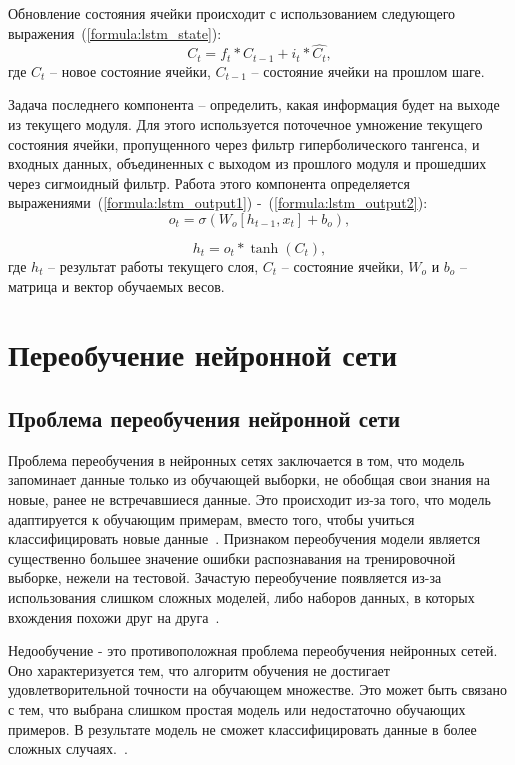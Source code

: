 Обновление состояния ячейки происходит с использованием следующего выражения~(\ref{formula:lstm_state}):
\begin{equation}\label{formula:lstm_state}
	C_t = f_t * C_{t-1} + i_t*\hat{C_t},
\end{equation}
где $C_t$ -- новое состояние ячейки, $C_{t-1}$ -- состояние ячейки на прошлом шаге.

Задача последнего компонента -- определить, какая информация будет на выходе из текущего модуля.
Для этого используется поточечное умножение текущего состояния ячейки, пропущенного через фильтр гиперболического тангенса, и входных данных, объединенных с выходом из прошлого модуля и прошедших через сигмоидный фильтр.
Работа этого компонента определяется выражениями~(\ref{formula:lstm_output1}) -~(\ref{formula:lstm_output2}):
\begin{equation}\label{formula:lstm_output1}
	o_t = \sigma(W_o[h_{t-1}, x_t] + b_o),
\end{equation}

\begin{equation}\label{formula:lstm_output2}
	h_t = o_t * \tanh(C_t),
\end{equation}
где $h_t$ -- результат работы текущего слоя, $C_t$ -- состояние ячейки, $W_o$ и $b_o$ -- матрица и вектор обучаемых весов.


\section{Переобучение нейронной сети}
\subsection{Проблема переобучения нейронной сети}\label{sec:retraining}
Проблема переобучения в нейронных сетях заключается в том, что модель запоминает данные только из обучающей выборки, не обобщая свои знания на новые, ранее не встречавшиеся данные. Это происходит из-за того, что модель адаптируется к обучающим примерам, вместо того, чтобы учиться классифицировать новые данные~\cite{overtraining1}. Признаком переобучения модели является существенно большее значение ошибки распознавания на тренировочной выборке, нежели на тестовой. Зачастую переобучение появляется из-за использования слишком сложных моделей, либо наборов данных, в которых вхождения похожи друг на друга~\cite{overtraining1}.

Недообучение - это противоположная проблема переобучения нейронных сетей. Оно характеризуется тем, что алгоритм обучения не достигает удовлетворительной точности на обучающем множестве. Это может быть связано с тем, что выбрана слишком простая модель или недостаточно обучающих примеров. В результате модель не сможет классифицировать данные в более сложных случаях.~\cite{overtraining1}.

